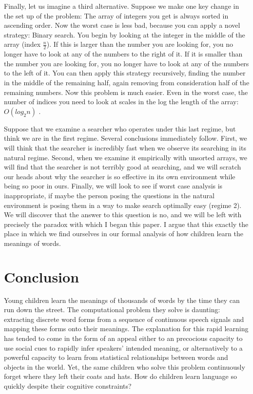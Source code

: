 \documentclass[review]{elsarticle}
\begin{document}
Finally, let us imagine a third alternative. Suppose we make one key change in the set up of the problem: The array of integers you get is always sorted in ascending order. Now the worst case is less bad, because you can apply a novel strategy: Binary search. You begin by looking at the integer in the middle of the array (index $\frac{n}{2}$). If this is larger than the number you are looking for, you no longer have to look at any of the numbers to the right of it. If it is smaller than the number you are looking for, you no longer have to look at any of the numbers to the left of it. You can then apply this strategy recursively, finding the number in the middle of the remaining half, again removing from consideration half of the remaining numbers. Now this problem is much easier. Even in the worst case, the number of indices you need to look at scales in the log the length of the array: $O\left(log_{2}n\right)$ \citep{knuth1998}.  

Suppose that we examine a searcher who operates under this last regime, but think we are in the first regime. Several conclusions immediately follow. First, we will think that the searcher is incredibly fast when we observe its searching in its natural regime. Second, when we examine it empirically with unsorted arrays, we will find that the searcher is not terribly good at searching, and we will scratch our heads about why the searcher is so effective in its own environment while being so poor in ours. Finally, we will look to see if worst case analysis is inappropriate, if maybe the person posing the questions in the natural environment is posing them in a way to make search optimally easy (regime 2). We will discover that the answer to this question is no, and we will be left with precisely the paradox with which I began this paper. I argue that this exactly the place in which we find ourselves in our formal analysis of how children learn the meanings of words.

\section{Conclusion}

Young children learn the meanings of thousands of words by the time they can run down the street\citep{mayor2011}. The computational problem they solve is daunting: extracting discrete word forms from a sequence of continuous speech signals and mapping these forms onto their meanings. The explanation for this rapid learning has tended to come in the form of an appeal either to an precocious capacity to use social cues to rapidly infer speakers' intended meaning, or alternatively to a powerful capacity to learn from statistical relationships between words and objects in the world. Yet, the same children who solve this problem continuously forget where they left their coats and hats. How do children learn language so quickly despite their cognitive constraints? 
 
\end{document}
